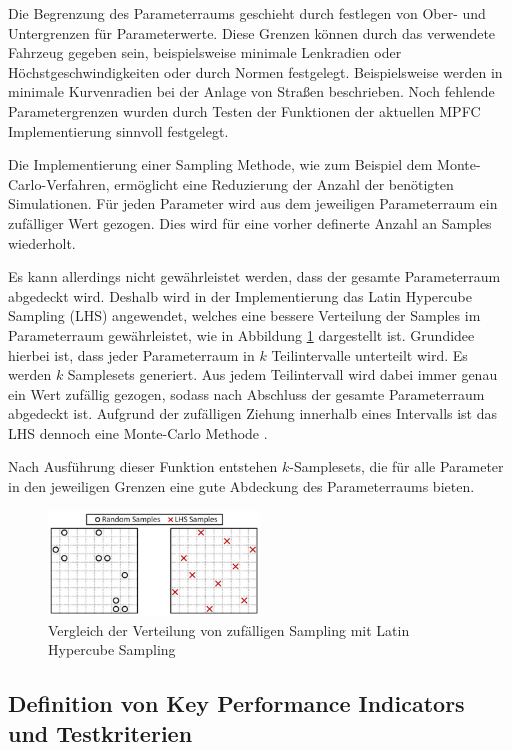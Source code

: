 Die Begrenzung des Parameterraums geschieht durch festlegen von Ober- und Untergrenzen für Parameterwerte. Diese Grenzen können durch das verwendete Fahrzeug gegeben sein, beispielsweise minimale Lenkradien oder Höchstgeschwindigkeiten oder durch Normen festgelegt. Beispielsweise werden in \cite{Bau2019} minimale Kurvenradien bei der Anlage von Straßen beschrieben. Noch fehlende Parametergrenzen wurden durch Testen der Funktionen der aktuellen MPFC Implementierung sinnvoll festgelegt.

Die Implementierung einer Sampling Methode, wie zum Beispiel dem Monte-Carlo-Verfahren, ermöglicht eine Reduzierung der Anzahl der benötigten Simulationen. Für jeden Parameter wird aus dem jeweiligen Parameterraum ein zufälliger Wert gezogen. Dies wird für eine vorher definerte Anzahl an Samples wiederholt.

Es kann allerdings nicht gewährleistet werden, dass der gesamte Parameterraum abgedeckt wird. Deshalb wird in der Implementierung das Latin Hypercube Sampling (LHS) angewendet, welches eine bessere Verteilung der Samples im Parameterraum gewährleistet, wie in Abbildung \ref{fig:Random_vs_LHS} dargestellt ist. Grundidee hierbei ist, dass jeder Parameterraum in $k$ Teilintervalle unterteilt wird. Es werden $k$ Samplesets generiert. Aus jedem Teilintervall wird dabei immer genau ein Wert zufällig gezogen, sodass nach Abschluss der gesamte Parameterraum abgedeckt ist. Aufgrund der zufälligen Ziehung innerhalb eines Intervalls ist das LHS dennoch eine Monte-Carlo Methode \cite{McKay1979}.\bigskip

\noindent Nach Ausführung dieser Funktion entstehen $k$-Samplesets, die für alle Parameter in den jeweiligen Grenzen eine gute Abdeckung des Parameterraums bieten.

\begin{figure}
    \centering
    \includegraphics[width=0.5\textwidth]{figures/3_Implementierung/LHS_random_compare.png}
    \caption{Vergleich der Verteilung von zufälligen Sampling mit Latin Hypercube Sampling \cite{Preece2015}}
    \label{fig:Random_vs_LHS}
\end{figure}

\subsection{Definition von Key Performance Indicators und Testkriterien} \label{subsec:KPI}


